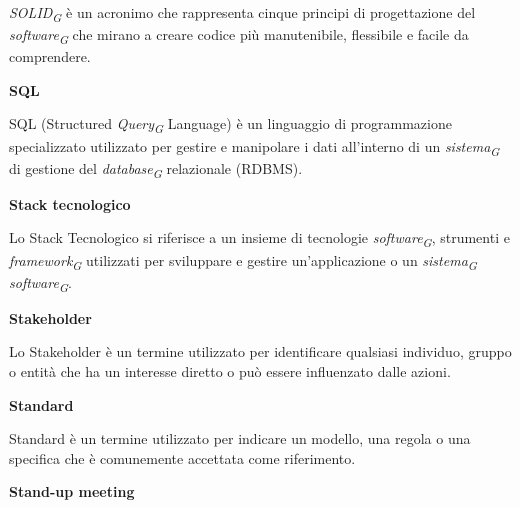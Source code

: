 \documentclass{article}
\begin{document}
\textit{SOLID}\textsubscript{\textit{G}} è un acronimo che rappresenta cinque principi di progettazione del \textit{software}\textsubscript{\textit{G}} che mirano a creare codice più manutenibile, flessibile e facile da comprendere.

\vspace{0.4cm}

\textbf{SQL}

\vspace{0.1cm}

SQL (Structured \textit{Query}\textsubscript{\textit{G}} Language) è un linguaggio di programmazione specializzato utilizzato per gestire e manipolare i dati all'interno di un \textit{sistema}\textsubscript{\textit{G}} di gestione del \textit{database}\textsubscript{\textit{G}} relazionale (RDBMS).

\vspace{0.4cm}

\textbf{Stack tecnologico}

\vspace{0.1cm}

Lo Stack Tecnologico si riferisce a un insieme di tecnologie \textit{software}\textsubscript{\textit{G}}, strumenti e \textit{framework}\textsubscript{\textit{G}} utilizzati per sviluppare e gestire un'applicazione o un \textit{sistema}\textsubscript{\textit{G}} \textit{software}\textsubscript{\textit{G}}.

\vspace{0.4cm}

\textbf{Stakeholder}

\vspace{0.1cm}

Lo Stakeholder è un termine utilizzato per identificare qualsiasi individuo, gruppo o entità che ha un interesse diretto o può essere influenzato dalle azioni.

\vspace{0.4cm}

\textbf{Standard}

\vspace{0.1cm}

Standard è un termine utilizzato per indicare un modello, una regola o una specifica che è comunemente accettata come riferimento.

\vspace{0.4cm}

\textbf{Stand-up meeting}

\vspace{0.1cm}
\end{document}
